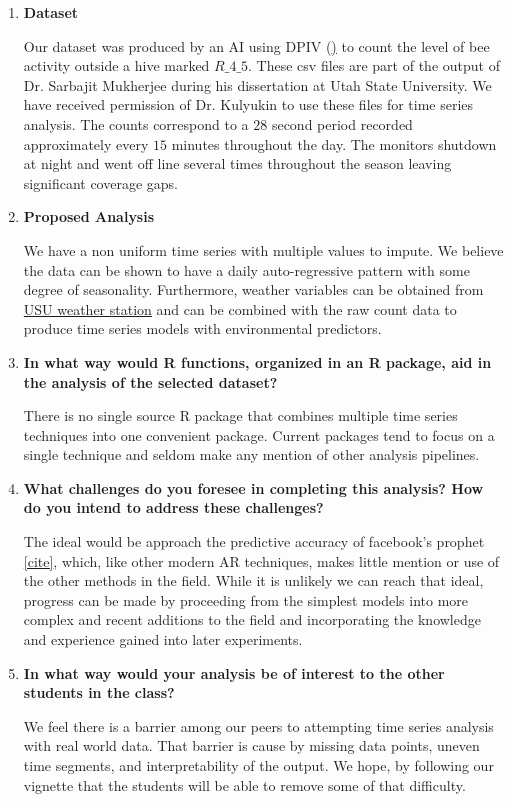\documentclass[12pt]{report}\usepackage[]{graphicx}\usepackage[]{color}
\begin{document}
\begin{enumerate}
\item {\bf Dataset}

Our dataset was produced by an AI using DPIV (\href{https://www.researchgate.net/figure/Directional-DPIV-based-bee-motion-estimation-algorithm_fig1_340021624})\cite{Willert1991} to count the level of bee activity outside a hive marked $R\_4\_5$. These csv files are part of the output of Dr. Sarbajit Mukherjee during his dissertation at Utah State University. We have received permission of Dr. Kulyukin to use these files for time series analysis. The counts correspond to a $28$ second period recorded approximately every $15$ minutes throughout the day. The monitors shutdown at night and went off line several times throughout the season leaving significant coverage gaps.

\item {\bf Proposed Analysis}

We have a non uniform time series with multiple values to impute. We believe the data can be shown to have a daily auto-regressive pattern with some degree of seasonality. Furthermore, weather variables can be obtained from \href{https://climate.usu.edu/mchd/dashboard/dashboard.php?network=USUwx&station=1279257&units=E&showgraph=0&}{USU weather station} and can be combined with the raw count data to produce time series models with environmental predictors.

\item {\bf In what way would R functions, organized in an R package, aid in the analysis of the selected dataset? }

There is no single source R package that combines multiple time series techniques into one convenient package. Current packages tend to focus on a single technique and seldom make any mention of other analysis pipelines.

\item {\bf What challenges do you foresee in completing this analysis? How do you intend to address these challenges? }

The ideal would be approach the predictive accuracy of facebook's prophet \href{https://facebook.github.io/prophet/}{[cite]}, which, like other modern AR techniques, makes little mention or use of the other methods in the field. While it is unlikely we can reach that ideal, progress can be made by proceeding from the simplest models into more complex and recent additions to the field and incorporating the knowledge and experience gained into later experiments.

\item {\bf In what way would your analysis be of interest to the other students in the class? }

We feel there is a barrier among our peers to attempting time series analysis with real world data. That barrier is cause by missing data points, uneven time segments, and interpretability of the output. We hope, by following our vignette that the students will be able to remove some of that difficulty.

\end{enumerate}

\end{document}
